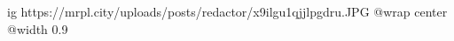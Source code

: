  
 
 
 
 

\ifcmt
  ig https://mrpl.city/uploads/posts/redactor/x9ilgu1qjjlpgdru.JPG
  @wrap center
  @width 0.9
\fi
